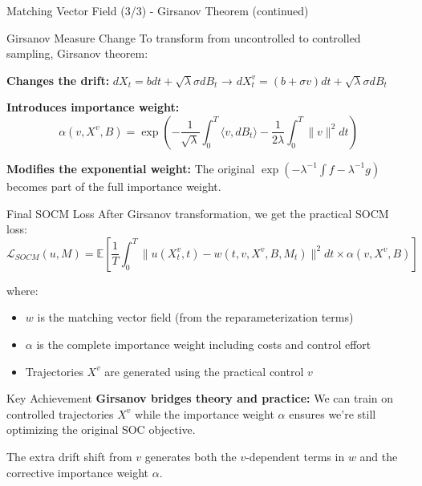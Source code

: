 \documentclass[aspectratio=169,xcolor=dvipsnames]{beamer}
\begin{document}
\begin{frame}[allowframebreaks]{Matching Vector Field (3/3) - Girsanov Theorem (continued)}

    
    \begin{alertblock}{Girsanov Measure Change}
        To transform from uncontrolled to controlled sampling, Girsanov theorem:
        
        \textbf{Changes the drift:} $dX_t = b dt + \sqrt{\lambda}\sigma dB_t$ → $dX_t^v = (b + \sigma v) dt + \sqrt{\lambda}\sigma dB_t$
        
        \textbf{Introduces importance weight:} 
        $$\alpha(v, X^v, B) = \exp\left(-\frac{1}{\sqrt{\lambda}}\int_0^T \langle v, dB_t\rangle - \frac{1}{2\lambda}\int_0^T \|v\|^2 dt\right)$$
        
        \textbf{Modifies the exponential weight:} The original $\exp(-\lambda^{-1}\int f - \lambda^{-1}g)$ becomes part of the full importance weight.
    \end{alertblock}
    
    \vspace{0.5cm}
    
    \begin{alertblock}{Final SOCM Loss}
        After Girsanov transformation, we get the practical SOCM loss:
        \begin{equation}
        \boxed{
        \mathcal{L}_{SOCM}(u, M) = \mathbb{E}\left[\frac{1}{T}\int_0^T \|u(X^v_t,t) - w(t, v, X^v, B, M_t)\|^2 dt \times \alpha(v, X^v, B)\right]
        }
        \end{equation}
        
        where:
        \begin{itemize}
            \item $w$ is the matching vector field (from the reparameterization terms)
            \item $\alpha$ is the complete importance weight including costs and control effort
            \item Trajectories $X^v$ are generated using the practical control $v$
        \end{itemize}
    \end{alertblock}
    
    \vspace{0.5cm}
    
    \begin{block}{Key Achievement}
        \textbf{Girsanov bridges theory and practice:} We can train on controlled trajectories $X^v$ while the importance weight $\alpha$ ensures we're still optimizing the original SOC objective.
        
        The extra drift shift from $v$ generates both the $v$-dependent terms in $w$ and the corrective importance weight $\alpha$.
    \end{block}

\end{frame}
\end{document}
